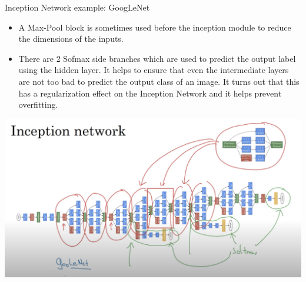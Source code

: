 \documentclass{article}
\begin{document}
\noindent Inception Network example: GoogLeNet

\begin{itemize}
    \item A Max-Pool block is sometimes used before the inception module to reduce the dimensions of the inputs.
    \item There are 2 Sofmax side branches which are used to predict the output label using the hidden layer. It helps to ensure that even the intermediate layers are not too bad to predict the output class of an image. It turns out that this has a regularization effect on the Inception Network and it helps prevent overfitting.
\end{itemize}

\begin{center}
\includegraphics[scale=0.4]{./images/inception_googlenet.png}
\end{center}

\printindex
\end{document}
